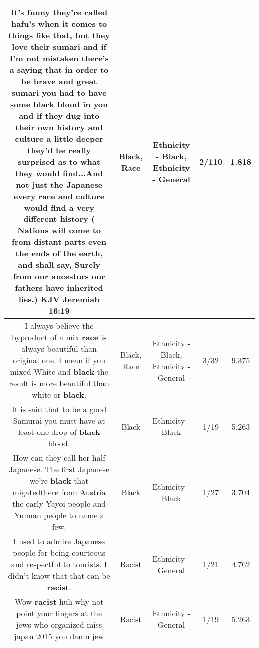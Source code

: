 \documentclass[11pt]{article}
\newlength\mylength
\begin{document}
\begin{center}
\begin{longtable}{|C{.65\mylength}|C{.30\mylength}|C{.12\mylength}|C{.12\mylength}|C{.12\mylength}|}
  \small It's funny they're called hafu's when it comes to things like that, but they love their sumari and if I'm not mistaken there's a saying that in order to be brave and great sumari you had to have some \textbf{black} blood in you and if they dug into their own history and culture a little deeper they'd be really surprised as to what they would find...And not just the Japanese every \textbf{race} and culture would find a very different history  ( Nations will come to from distant parts even the ends of the earth, and shall say, Surely from our ancestors our fathers have inherited lies.) KJV Jeremiah 16:19\normalsize   & Black, Race & Ethnicity - Black, Ethnicity - General & 2/110 & 1.818 \\  \hline
  \small I always believe the byproduct of a mix \textbf{race} is always beautiful than original one. I mean if you mixed White and \textbf{black} the result is more beautiful than white or \textbf{black}.\normalsize   & Black, Race & Ethnicity - Black, Ethnicity - General & 3/32 & 9.375 \\  \hline
  \small It is said that to be a good Samurai you must have at least one drop of \textbf{black} blood.\normalsize   & Black & Ethnicity - Black & 1/19 & 5.263 \\  \hline
  \small How can they call her half Japanese. The first Japanese we're \textbf{black} that migatedthere from Austria the early Yayoi people and Yunnan people to name a few.\normalsize   & Black & Ethnicity - Black & 1/27 & 3.704 \\  \hline
  \small I used to admire Japanese people for being courteous and respectful to tourists. I didn't know that that can be \textbf{racist}.\normalsize   & Racist & Ethnicity - General & 1/21 & 4.762 \\  \hline
  \small Wow \textbf{racist} huh why not point your fingers at the jews who organized miss japan 2015 you damn jew\normalsize   & Racist & Ethnicity - General & 1/19 & 5.263 \\  \hline

\end{longtable}
\end{center}
\end{document}
